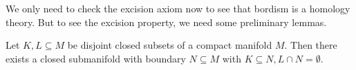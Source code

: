 \documentclass[a4paper,11pt]{article}
\begin{document}
\begin{comment}[Transversality, Sard, Mayer-Vi\"etoris,...]
Before checking the next axioms, we need to do some more differential topology. (Maybe I will put this in chapter 1\dots)

\begin{definition}[Tangent space\ \cite{lee}]
\end{definition}

Need a few more things, differential, etc.

\begin{definition}[Transversality\ \cite{brocker}]
    Let \(f:M\to N\) a smooth map between manifolds. Let \(U\subseteq N\) be an (\(n-k\))-dimensional submanifold of \(N\) 
\end{definition}
Maybe Lee's definition is better.\\

\begin{definition}[Regular value]
\end{definition}

\begin{theorem}[Sard's theorem\ \cite{lee}]
\end{theorem}

I will not prove this theorem, a proof can be found in\ \cite{lee}.

\begin{definition}[Seperating function\cite{brocker}]
\end{definition}

\begin{lemma}
    Slogan: The Mayer-Vi\"etoris sequence is equivalent to the excision axiom.
\end{lemma}

\begin{lemma}
    The Mayer-Vi\"etoris sequence
    \[\dots\xrightarrow{\partial}\mathfrak{N}_n(X_0\cap X_1)\xrightarrow{\alpha}\mathfrak{N}_n(X_0\oplus\mathfrak{N}_n(X_1))\xrightarrow{\beta}\mathfrak{N}_n(X)\xrightarrow{\partial}\mathfrak{N}_{n-1}(X_0\cap X_1)\xrightarrow{\alpha}\dots\]
    is exact.
\end{lemma}

\end{comment}

We only need to check the excision axiom now to see that bordism is a homology theory. But to see the excision property, we need some preliminary lemmas.

\begin{lemma}\label{plemma}
    Let \(K,L\subseteq M\) be disjoint closed subsets of a compact manifold \(M\). Then there exists a closed submanifold with boundary \(N\subseteq M\) with \(K\subseteq N, L\cap N=\emptyset\).
\end{lemma}
\end{document}
